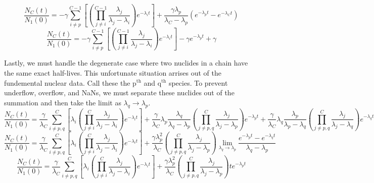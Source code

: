 \documentclass[letterpaper]{physor2018}
\newcommand{\pth}{p$^{\mathrm{th}}$\xspace}
\newcommand{\qth}{q$^{\mathrm{th}}$\xspace}
\begin{document}
\begin{equation}
\label{last-stable-and-almost-stable-3}
   \frac{N_C(t)}{N_1(0)} = -\gamma\sum_{i\ne p}^{C-1} \left[\left(\prod_{j\ne i}^{C-1} \frac{\lambda_j}{\lambda_j - \lambda_i}\right) e^{-\lambda_i t}\right]
                           + \frac{\gamma\lambda_p}{\lambda_C - \lambda_p} \left(e^{-\lambda_p t} - e^{-\lambda_C t}\right)
\end{equation}
\begin{equation}
\label{last-stable-and-almost-stable-4}
   \frac{N_C(t)}{N_1(0)} = -\gamma\sum_{i\ne p}^{C-1} \left[\left(\prod_{j\ne i}^{C-1} \frac{\lambda_j}{\lambda_j - \lambda_i}\right) e^{-\lambda_i t}\right]
                           -\gamma e^{-\lambda_p t} + \gamma
\end{equation}

Lastly, we must handle the degenerate case where two nuclides in a chain  have the same exact half-lives.
This unfortunate situation arrises out of the fundemental nuclear data. Call these the \pth and \qth
species. To prevent underflow, overflow, and NaNs, we must separate these nuclides out of the summation
and then take the limit as $\lambda_q \to \lambda_p$.
\begin{equation}
\label{pq-same-0}
   \frac{N_C(t)}{N_1(0)} = \frac{\gamma}{\lambda_C}\sum_{i\ne p,q}^{C} \left[\lambda_i \left(\prod_{j\ne i}^{C} \frac{\lambda_j}{\lambda_j - \lambda_i}\right) e^{-\lambda_i t}\right]
                           + \frac{\gamma}{\lambda_C} \lambda_p \frac{\lambda_q}{\lambda_q - \lambda_p} \left(\prod_{j\ne p,q}^{C} \frac{\lambda_j}{\lambda_j - \lambda_p} \right) e^{-\lambda_p t}
                           + \frac{\gamma}{\lambda_C} \lambda_q \frac{\lambda_p}{\lambda_p - \lambda_q} \left(\prod_{j\ne p,q}^{C} \frac{\lambda_j}{\lambda_j - \lambda_q} \right) e^{-\lambda_q t}
\end{equation}
\begin{equation}
\label{pq-same-1}
   \frac{N_C(t)}{N_1(0)} = \frac{\gamma}{\lambda_C}\sum_{i\ne p,q}^{C} \left[\lambda_i \left(\prod_{j\ne i}^{C} \frac{\lambda_j}{\lambda_j - \lambda_i}\right) e^{-\lambda_i t}\right]
                           + \frac{\gamma\lambda_p^2}{\lambda_C} \left(\prod_{j\ne p,q}^{C} \frac{\lambda_j}{\lambda_j - \lambda_p} \right)
                             \lim_{\lambda_q\to\lambda_p}\frac{e^{-\lambda_p t} - e^{-\lambda_q t}}{\lambda_q - \lambda_p}
\end{equation}
\begin{equation}
\label{pq-same-2}
   \frac{N_C(t)}{N_1(0)} = \frac{\gamma}{\lambda_C}\sum_{i\ne p,q}^{C} \left[\lambda_i \left(\prod_{j\ne i}^{C} \frac{\lambda_j}{\lambda_j - \lambda_i}\right) e^{-\lambda_i t}\right]
                           + \frac{\gamma\lambda_p^2}{\lambda_C} \left(\prod_{j\ne p,q}^{C} \frac{\lambda_j}{\lambda_j - \lambda_p} \right) t e^{-\lambda_p t}
\end{equation}
\end{document}
